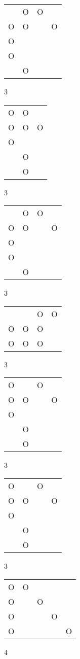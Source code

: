 \begin{tabular}{|m{0.2cm}m{0.2cm}m{0.2cm}m{0.2cm}|}\hline
 &O&O& \\
O&O& &O\\
O& & & \\
O& & & \\
 &O& & \\
\hline\end{tabular}3
\begin{tabular}{|m{0.2cm}m{0.2cm}m{0.2cm}|}\hline
O&O& \\
O&O&O\\
O& & \\
 &O& \\
 &O& \\
\hline\end{tabular}3
\begin{tabular}{|m{0.2cm}m{0.2cm}m{0.2cm}m{0.2cm}|}\hline
 &O&O& \\
O&O& &O\\
O& & & \\
O& & & \\
 &O& & \\
\hline\end{tabular}3
\begin{tabular}{|m{0.2cm}m{0.2cm}m{0.2cm}m{0.2cm}|}\hline
 & &O&O\\
O&O&O& \\
O&O&O& \\
\hline\end{tabular}3
\begin{tabular}{|m{0.2cm}m{0.2cm}m{0.2cm}m{0.2cm}|}\hline
O& &O& \\
O&O& &O\\
O& & & \\
 &O& & \\
 &O& & \\
\hline\end{tabular}3
\begin{tabular}{|m{0.2cm}m{0.2cm}m{0.2cm}m{0.2cm}|}\hline
O& &O& \\
O&O& &O\\
O& & & \\
 &O& & \\
 &O& & \\
\hline\end{tabular}3
\begin{tabular}{|m{0.2cm}m{0.2cm}m{0.2cm}m{0.2cm}m{0.2cm}|}\hline
O&O& & & \\
O& &O& & \\
O& & &O& \\
O& & & &O\\
\hline\end{tabular}4
